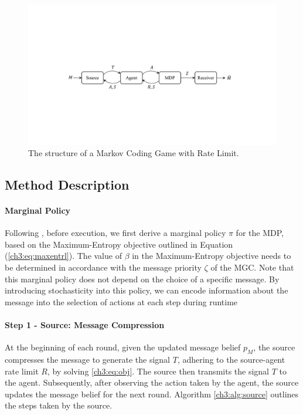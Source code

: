 \begin{figure}[h] 
    \centering \includegraphics[width=0.9\linewidth]{figs/ch3/MGC.pdf}
    \caption{The structure of a Markov Coding Game with Rate Limit.}\label{ch3:fig:mcg} 
\end{figure}

\subsection{Method Description}\label{ch3:sec:mgcmethod}

\paragraph{Marginal Policy} 
Following \cite{sokota2022communicating}, before execution, we first derive a marginal policy $\pi$ for the MDP, based on the Maximum-Entropy objective outlined in Equation (\ref{ch3:eq:maxentrl}). The value of $\beta$ in the Maximum-Entropy objective needs to be determined in accordance with the message priority $\zeta$ of the MGC. Note that this marginal policy does not depend on the choice of a specific message. By introducing stochasticity into this policy, we can encode information about the message into the selection of actions at each step during runtime

\paragraph{Step 1 - Source: Message Compression}
At the beginning of each round, given the updated message belief $p_M$, the source compresses the message to generate the signal $T$, adhering to the source-agent rate limit $R$, by solving \eqref{ch3:eq:obj}. The source then transmits the signal $T$ to the agent. Subsequently, after observing the action taken by the agent, the source updates the message belief for the next round. Algorithm \ref{ch3:alg:source} outlines the steps taken by the source.

